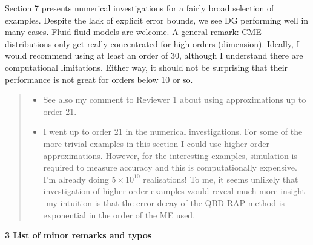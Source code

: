 \documentclass[a4paper]{article}
\begin{document}
Section 7 presents numerical investigations for a fairly broad selection of examples. Despite the lack of explicit error bounds, we see DG performing well in many cases. Fluid-fluid models are welcome. A general remark: CME distributions only get really concentrated for high orders (dimension). Ideally, I would recommend using at least an order of 30, although I understand there are computational limitations. Either way, it should not be surprising that their performance is not great for orders below 10 or so.
\begin{quote}
    \begin{itemize}
        \item See also my comment to Reviewer 1 about using approximations up to order 21. 
        
        \item I went up to order 21 in the numerical investigations. For some of the more trivial examples in this section I could use higher-order approximations. However, for the interesting examples, simulation is required to measure accuracy and this is computationally expensive. I'm already doing \(5\times 10^{10}\) realisations! To me, it seems unlikely that investigation of higher-order examples would reveal much more insight -my intuition is that the error decay of the QBD-RAP method is exponential in the order of the ME used. 
    \end{itemize}
\end{quote}

\noindent\textbf{3 List of minor remarks and typos}
\end{document}
